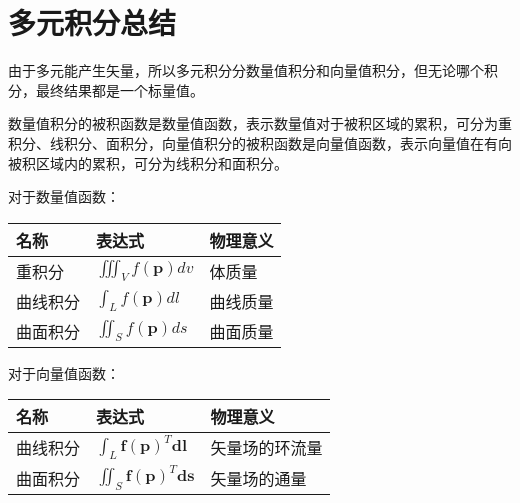 \section{多元积分总结}

由于多元能产生矢量，所以多元积分分数量值积分和向量值积分，但无论哪个积分，最终结果都是一个标量值。

数量值积分的被积函数是数量值函数，表示数量值对于被积区域的累积，可分为重积分、线积分、面积分，向量值积分的被积函数是向量值函数，表示向量值在有向被积区域内的累积，可分为线积分和面积分。

对于数量值函数：
\begin{table}[h]
\centering
\begin{tabular}{lll}
    \toprule
    名称 & 表达式 & 物理意义\\
    \midrule
    重积分   & $\iiint_V{f\left( \boldsymbol{p} \right) dv}$ & 体质量\\
    曲线积分 & $\int_L{f\left( \boldsymbol{p} \right) dl}$   & 曲线质量\\
    曲面积分 & $\iint_S{f\left( \boldsymbol{p} \right) ds}$  & 曲面质量\\
    \bottomrule
\end{tabular}
\end{table}

对于向量值函数：
\begin{table}[h]
\centering
\begin{tabular}{lll}
    \toprule
    名称 & 表达式 & 物理意义\\
    \midrule
    曲线积分 & $\int_L{\boldsymbol{f}\left( \boldsymbol{p} \right) ^T\boldsymbol{dl}}$  & 矢量场的环流量\\
    曲面积分 & $\iint_S{\boldsymbol{f}\left( \boldsymbol{p} \right) ^T\boldsymbol{ds}}$ & 矢量场的通量\\
    \bottomrule
\end{tabular}
\end{table}




